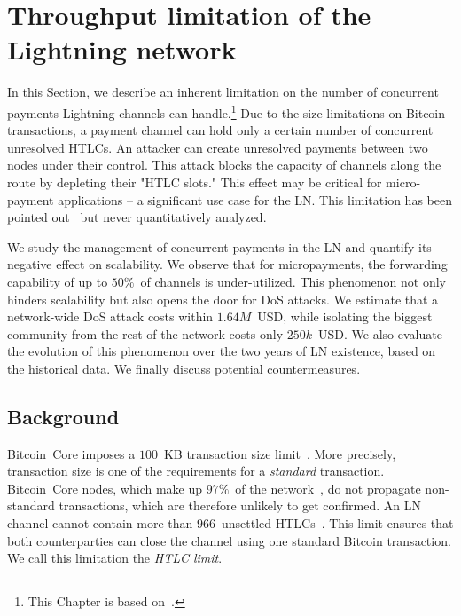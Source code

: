 \chapter{Throughput limitation of the Lightning network}

\label{Chapter08HTLClimit}

In this Section, we describe an inherent limitation on the number of concurrent payments Lightning channels can handle.\footnote{This Chapter is based on~\cite{Tikhomirov2020a}.}
Due to the size limitations on Bitcoin transactions, a payment channel can hold only a certain number of concurrent unresolved HTLCs.
An attacker can create unresolved payments between two nodes under their control.
This attack blocks the capacity of channels along the route by depleting their "HTLC slots."
This effect may be critical for micro-payment applications -- a significant use case for the LN.
This limitation has been pointed out~\cite{EmelyanenkoK2017} but never quantitatively analyzed.

We study the management of concurrent payments in the LN and quantify its negative effect on scalability.
We observe that for micropayments, the forwarding capability of up to $50\%$~of channels is under-utilized.
This phenomenon not only hinders scalability but also opens the door for DoS attacks.
We estimate that a network-wide DoS attack costs within $1.64M$~USD, while isolating the biggest community from the rest of the network costs only $250k$~USD\@.
We also evaluate the evolution of this phenomenon over the two years of LN existence, based on the historical data.
We finally discuss potential countermeasures.


\section{Background} \label{max-htlc-background}

Bitcoin~Core imposes a $100$~KB transaction size limit~\cite{StandardTxBitcoinSE, BitcoinCoreMaxTxWeight}.
More precisely, transaction size is one of the requirements for a \textit{standard} transaction.
Bitcoin~Core nodes, which make up $97\%$~of the network~\cite{CoinDance}, do not propagate non-standard transactions, which are therefore unlikely to get confirmed.
An LN channel cannot contain more than $966$~unsettled HTLCs~\cite{BOLT2Rationale}.
This limit ensures that both counterparties can close the channel using one standard Bitcoin transaction.
We call this limitation the \textit{HTLC limit}.


